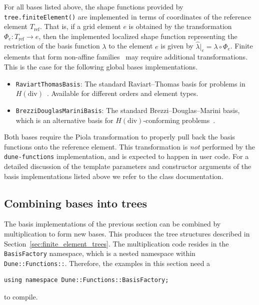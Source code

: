 \documentclass[a4paper,10pt,headings=normal,bibliography=totoc]{scrartcl}
\newcommand{\cpp}[1]{\lstinline[basicstyle=\ttfamily]!#1!}
\newcommand{\dunemodule}[1]{\texttt{#1}}
\begin{document}
For all bases listed above, the shape functions provided by
\cpp{tree.finiteElement()} are implemented in terms of coordinates of the reference
element $T_\text{ref}$. That is, if a grid element $e$ is obtained by the transformation
$\Phi_e: T_\text{ref} \to e$, then the implemented localized shape function
representing the restriction of the basis function $\lambda$ to the
element $e$ is given by $\hat{\lambda}|_e = \lambda\circ\Phi_e$.
Finite elements that form non-affine families~\cite{ciarlet:1978}
may require additional transformations. This is the case for the following global
bases implementations.

\begin{itemize}
 \item \cpp{RaviartThomasBasis}: The standard Raviart--Thomas basis for problems in
  $H(\text{div})$~\cite{boffi_brezzi_fortin:2013}.  Available for different orders and element types.

 \item \cpp{BrezziDouglasMariniBasis}: The standard Brezzi--Douglas--Marini basis, which is an
  alternative basis for $H(\text{div})$-conforming problems~\cite{boffi_brezzi_fortin:2013}.
\end{itemize}

Both bases require the Piola transformation to properly pull back the basis functions
onto the reference element.  This transformation is \emph{not} performed by the
\dunemodule{dune-functions} implementation, and is expected to happen in user code.
For a detailed discussion of the template parameters and constructor arguments
of the basis implementations listed above we refer to the class documentation.


\subsection{Combining bases into trees}
\label{sec:composed_bases}

The basis implementations of the previous section can be combined by multiplication to form new bases.
This produces the tree structures described in Section~\ref{sec:finite_element_trees}.
The multiplication code resides in the \cpp{BasisFactory} namespace, which is a nested namespace
within \cpp{Dune::Functions::}. Therefore, the examples in this section need a
\begin{lstlisting}[style=Example]
using namespace Dune::Functions::BasisFactory;
\end{lstlisting}
to compile.
\end{document}
